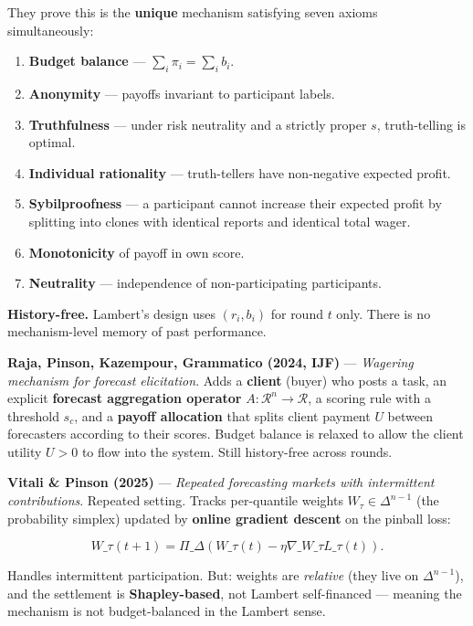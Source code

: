 \documentclass[11pt]{article}
\begin{document}
They prove this is the \textbf{unique} mechanism satisfying seven axioms simultaneously:

\begin{enumerate}
\item \textbf{Budget balance} --- $\sum_i \pi_i = \sum_i b_i$.
\item \textbf{Anonymity} --- payoffs invariant to participant labels.
\item \textbf{Truthfulness} --- under risk neutrality and a strictly proper $s$, truth-telling is optimal.
\item \textbf{Individual rationality} --- truth-tellers have non-negative expected profit.
\item \textbf{Sybilproofness} --- a participant cannot increase their expected profit by splitting into clones with identical reports and identical total wager.
\item \textbf{Monotonicity} of payoff in own score.
\item \textbf{Neutrality} --- independence of non-participating participants.
\end{enumerate}

\textbf{History-free.} Lambert's design uses $(r_i, b_i)$ for round $t$ only. There is no mechanism-level memory of past performance.

\textbf{Raja, Pinson, Kazempour, Grammatico (2024, IJF)} --- \emph{Wagering mechanism for forecast elicitation}.
Adds a \textbf{client} (buyer) who posts a task, an explicit \textbf{forecast aggregation operator} $A: \mathcal R^n \to \mathcal R$, a scoring rule with a threshold $s_c$, and a \textbf{payoff allocation} that splits client payment $U$ between forecasters according to their scores. Budget balance is relaxed to allow the client utility $U > 0$ to flow into the system. Still history-free across rounds.

\textbf{Vitali \& Pinson (2025)} --- \emph{Repeated forecasting markets with intermittent contributions}.
Repeated setting. Tracks per-quantile weights $W_{\tau} \in \Delta^{n-1}$ (the probability simplex) updated by \textbf{online gradient descent} on the pinball loss:

$$
W\_{\tau}(t+1) = \Pi\_{\Delta}\!\left( W\_{\tau}(t) - \eta \nabla\_{W\_\tau} L\_\tau(t) \right).
$$

Handles intermittent participation. But: weights are \emph{relative} (they live on $\Delta^{n-1}$), and the settlement is \textbf{Shapley-based}, not Lambert self-financed --- meaning the mechanism is not budget-balanced in the Lambert sense.
\end{document}
